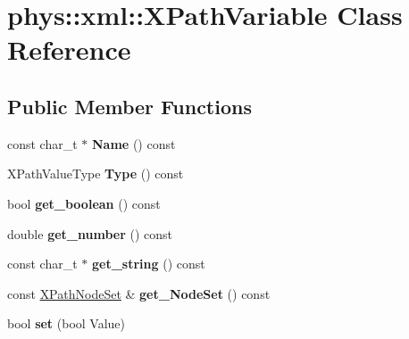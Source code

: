 \hypertarget{classphys_1_1xml_1_1XPathVariable}{
\section{phys::xml::XPathVariable Class Reference}
\label{df/dee/classphys_1_1xml_1_1XPathVariable}
}
\subsection*{Public Member Functions}
\begin{DoxyCompactItemize}
\item 
\hypertarget{classphys_1_1xml_1_1XPathVariable_af51c0a3362e130e30df85068ab95de63}{
const char\_\-t $\ast$ {\bfseries Name} () const }
\label{df/dee/classphys_1_1xml_1_1XPathVariable_af51c0a3362e130e30df85068ab95de63}

\item 
\hypertarget{classphys_1_1xml_1_1XPathVariable_a6c2986292fe674b79ea9dbf261c4a96f}{
XPathValueType {\bfseries Type} () const }
\label{df/dee/classphys_1_1xml_1_1XPathVariable_a6c2986292fe674b79ea9dbf261c4a96f}

\item 
\hypertarget{classphys_1_1xml_1_1XPathVariable_a8e879dfdd22d4e4cd00f79580de98068}{
bool {\bfseries get\_\-boolean} () const }
\label{df/dee/classphys_1_1xml_1_1XPathVariable_a8e879dfdd22d4e4cd00f79580de98068}

\item 
\hypertarget{classphys_1_1xml_1_1XPathVariable_a8d8ee4ea7868cbf76f2f926374ac5cab}{
double {\bfseries get\_\-number} () const }
\label{df/dee/classphys_1_1xml_1_1XPathVariable_a8d8ee4ea7868cbf76f2f926374ac5cab}

\item 
\hypertarget{classphys_1_1xml_1_1XPathVariable_a045574b064274e4b74e16b1e9e555991}{
const char\_\-t $\ast$ {\bfseries get\_\-string} () const }
\label{df/dee/classphys_1_1xml_1_1XPathVariable_a045574b064274e4b74e16b1e9e555991}

\item 
\hypertarget{classphys_1_1xml_1_1XPathVariable_a42aac5e1ef0d8231bc50dc6304738e62}{
const \hyperlink{classphys_1_1xml_1_1XPathNodeSet}{XPathNodeSet} \& {\bfseries get\_\-NodeSet} () const }
\label{df/dee/classphys_1_1xml_1_1XPathVariable_a42aac5e1ef0d8231bc50dc6304738e62}

\item 
\hypertarget{classphys_1_1xml_1_1XPathVariable_abec0df58ae37f5b223e2bcb5a5016faf}{
bool {\bfseries set} (bool Value)}
\label{df/dee/classphys_1_1xml_1_1XPathVariable_abec0df58ae37f5b223e2bcb5a5016faf}


\end{DoxyCompactItemize}

